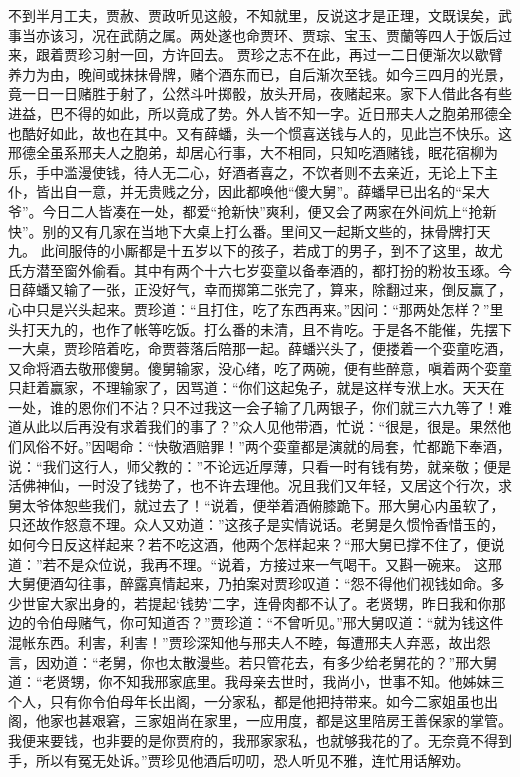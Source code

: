 \documentclass[12pt,oneside]{book}
\begin{document}
不到半月工夫，贾赦、贾政听见这般，不知就里，反说这才是正理，文既误矣，武事当亦该习，况在武荫之属。两处遂也命贾环、贾琮、宝玉、贾蘭等四人于饭后过来，跟着贾珍习射一回，方许回去。
贾珍之志不在此，再过一二日便渐次以歇臂养力为由，晚间或抹抹骨牌，赌个酒东而已，自后渐次至钱。如今三四月的光景，竟一日一日赌胜于射了，公然斗叶掷骰，放头开局，夜赌起来。家下人借此各有些进益，巴不得的如此，所以竟成了势。外人皆不知一字。近日邢夫人之胞弟邢德全也酷好如此，故也在其中。又有薛蟠，头一个惯喜送钱与人的，见此岂不快乐。这邢德全虽系邢夫人之胞弟，却居心行事，大不相同，只知吃酒赌钱，眠花宿柳为乐，手中滥漫使钱，待人无二心，好酒者喜之，不饮者则不去亲近，无论上下主仆，皆出自一意，并无贵贱之分，因此都唤他“傻大舅”。薛蟠早已出名的“呆大爷”。今日二人皆凑在一处，都爱“抢新快”爽利，便又会了两家在外间炕上“抢新快”。别的又有几家在当地下大桌上打么番。里间又一起斯文些的，抹骨牌打天九。
此间服侍的小厮都是十五岁以下的孩子，若成丁的男子，到不了这里，故尤氏方潜至窗外偷看。其中有两个十六七岁娈童以备奉酒的，都打扮的粉妆玉琢。今日薛蟠又输了一张，正没好气，幸而掷第二张完了，算来，除翻过来，倒反赢了，心中只是兴头起来。贾珍道：“且打住，吃了东西再来。”因问：“那两处怎样？”里头打天九的，也作了帐等吃饭。打么番的未清，且不肯吃。于是各不能催，先摆下一大桌，贾珍陪着吃，命贾蓉落后陪那一起。薛蟠兴头了，便搂着一个娈童吃酒，又命将酒去敬邢傻舅。傻舅输家，没心绪，吃了两碗，便有些醉意，嗔着两个娈童只赶着赢家，不理输家了，因骂道：“你们这起兔子，就是这样专洑上水。天天在一处，谁的恩你们不沾？只不过我这一会子输了几两银子，你们就三六九等了！难道从此以后再没有求着我们的事了？”众人见他带酒，忙说：“很是，很是。果然他们风俗不好。”因喝命：“快敬酒赔罪！”两个娈童都是演就的局套，忙都跪下奉酒，说：“我们这行人，师父教的：”不论远近厚薄，只看一时有钱有势，就亲敬；便是活佛神仙，一时没了钱势了，也不许去理他。况且我们又年轻，又居这个行次，求舅太爷体恕些我们，就过去了！“说着，便举着酒俯膝跪下。邢大舅心内虽软了，只还故作怒意不理。众人又劝道：”这孩子是实情说话。老舅是久惯怜香惜玉的，如何今日反这样起来？若不吃这酒，他两个怎样起来？“邢大舅已撑不住了，便说道：”若不是众位说，我再不理。“说着，方接过来一气喝干。又斟一碗来。
这邢大舅便酒勾往事，醉露真情起来，乃拍案对贾珍叹道：“怨不得他们视钱如命。多少世宦大家出身的，若提起‘钱势’二字，连骨肉都不认了。老贤甥，昨日我和你那边的令伯母赌气，你可知道否？”贾珍道：“不曾听见。”邢大舅叹道：“就为钱这件混帐东西。利害，利害！”贾珍深知他与邢夫人不睦，每遭邢夫人弃恶，故出怨言，因劝道：“老舅，你也太散漫些。若只管花去，有多少给老舅花的？”邢大舅道：“老贤甥，你不知我邢家底里。我母亲去世时，我尚小，世事不知。他姊妹三个人，只有你令伯母年长出阁，一分家私，都是他把持带来。如今二家姐虽也出阁，他家也甚艰窘，三家姐尚在家里，一应用度，都是这里陪房王善保家的掌管。我便来要钱，也非要的是你贾府的，我邢家家私，也就够我花的了。无奈竟不得到手，所以有冤无处诉。”贾珍见他酒后叨叨，恐人听见不雅，连忙用话解劝。
\end{document}
